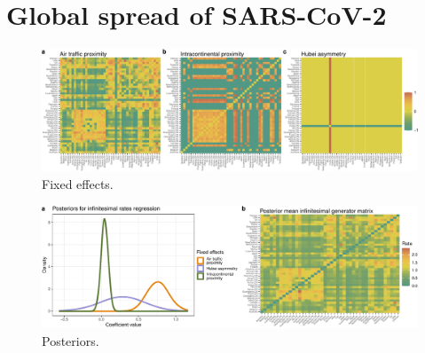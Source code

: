 \documentclass[12pt]{article} %
\begin{document}
\section{Global spread of SARS-CoV-2}


\begin{figure}[!t]
	\centering
	\includegraphics[width=\linewidth]{fixedEffects.pdf}
	\caption{Fixed effects.}\label{fig:FE}
\end{figure}

\begin{figure}[!t]
	\centering
	\includegraphics[width=\linewidth]{postViz.pdf}
	\caption{Posteriors.}\label{fig:FE}
\end{figure}
\end{document}
